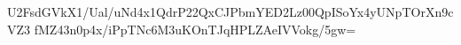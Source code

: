U2FsdGVkX1/Ual/uNd4x1QdrP22QxCJPbmYED2Lz00QpISoYx4yUNpTOrXn9cVZ3
fMZ43n0p4x/iPpTNc6M3uKOnTJqHPLZAeIVVokg/5gw=
